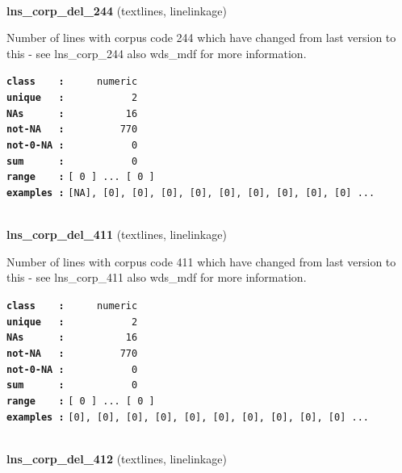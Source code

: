 \documentclass[]{article}
\begin{document}
~

\textbf{lns\_corp\_del\_244} (textlines, linelinkage)

Number of lines with corpus code 244 which have changed from last
version to this - see lns\_corp\_244 also wds\_mdf for more information.

\textbf{\texttt{class\ \ \ \ :}} \texttt{~~~~~numeric}\\
\textbf{\texttt{unique\ \ \ :}} \texttt{~~~~~~~~~~~2}\\
\textbf{\texttt{NAs\ \ \ \ \ \ :}} \texttt{~~~~~~~~~~16}\\
\textbf{\texttt{not-NA\ \ \ :}} \texttt{~~~~~~~~~770}\\
\textbf{\texttt{not-0-NA\ :}} \texttt{~~~~~~~~~~~0}\\
\textbf{\texttt{sum\ \ \ \ \ \ :}} \texttt{~~~~~~~~~~~0}\\
\textbf{\texttt{range\ \ \ \ :}}
\texttt{{[}\ 0\ {]}\ ...\ {[}\ 0\ {]}}\\
\textbf{\texttt{examples\ :}}
\texttt{{[}NA{]},\ {[}0{]},\ {[}0{]},\ {[}0{]},\ {[}0{]},\ {[}0{]},\ {[}0{]},\ {[}0{]},\ {[}0{]},\ {[}0{]}\ ...}\\

~

\textbf{lns\_corp\_del\_411} (textlines, linelinkage)

Number of lines with corpus code 411 which have changed from last
version to this - see lns\_corp\_411 also wds\_mdf for more information.

\textbf{\texttt{class\ \ \ \ :}} \texttt{~~~~~numeric}\\
\textbf{\texttt{unique\ \ \ :}} \texttt{~~~~~~~~~~~2}\\
\textbf{\texttt{NAs\ \ \ \ \ \ :}} \texttt{~~~~~~~~~~16}\\
\textbf{\texttt{not-NA\ \ \ :}} \texttt{~~~~~~~~~770}\\
\textbf{\texttt{not-0-NA\ :}} \texttt{~~~~~~~~~~~0}\\
\textbf{\texttt{sum\ \ \ \ \ \ :}} \texttt{~~~~~~~~~~~0}\\
\textbf{\texttt{range\ \ \ \ :}}
\texttt{{[}\ 0\ {]}\ ...\ {[}\ 0\ {]}}\\
\textbf{\texttt{examples\ :}}
\texttt{{[}0{]},\ {[}0{]},\ {[}0{]},\ {[}0{]},\ {[}0{]},\ {[}0{]},\ {[}0{]},\ {[}0{]},\ {[}0{]},\ {[}0{]}\ ...}\\

~

\textbf{lns\_corp\_del\_412} (textlines, linelinkage)
\end{document}
